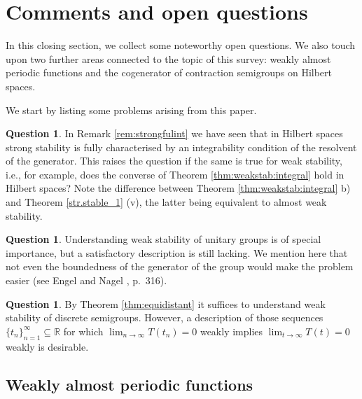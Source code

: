 \documentclass[11pt,intlimits, draft,oneside]{amsart}
\theoremstyle{definition}
\newtheorem{question}[thm]{Question}
\def\RR{\mathbb{R}}
\begin{document}
\section{Comments and open questions} \label{section:comments_and_open_quetions}
 In this closing section, we collect some
noteworthy open questions. We also touch upon two further areas
 connected to the topic of this survey: weakly almost periodic
functions and the cogenerator of contraction semigroups on Hilbert
spaces.

\smallskip
We start by listing some problems arising from this paper.
\begin{question}
In Remark \ref{rem:strongfulint} we have seen that in Hilbert spaces
strong stability is fully characterised by an integrability
condition of the resolvent of the generator. This raises the
question if the same is true for weak stability, i.e., for example, does the
converse
 of Theorem \ref{thm:weakstab:integral} hold in Hilbert spaces? Note the
difference between Theorem \ref{thm:weakstab:integral} b) and
Theorem \ref{str.stable_1} (v), the latter being equivalent to
almost weak stability.
\end{question}

\begin{question}
Understanding weak stability of unitary groups is of special
importance, but a satisfactory description is still lacking. We
mention here that not even the boundedness of the generator of the
group would make the problem easier (see Engel and Nagel
\cite{engel/nagel:2000}, p.~316).

\end{question}

\begin{question}
 By Theorem \ref{thm:equidistant} it suffices to understand weak stability of
discrete semigroups. However, a description of those sequences
$\{t_n\}_{n=1}^\infty\subseteq\RR$ for which
$\lim_{n\to\infty}T(t_n)= 0$ weakly implies $\lim_{t\to\infty} T(t)=
0$ weakly is desirable.
\end{question}


\subsection{Weakly almost periodic functions}\label{subsec:weakper}
\end{document}
